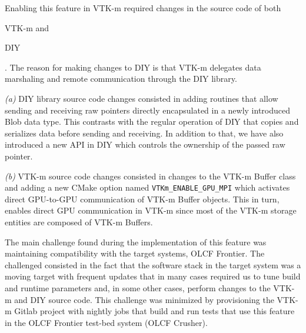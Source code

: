 Enabling this feature in VTK-m required changes in the source code of both \begin{enumerate*} [label=\itshape(\alph*\upshape)]\item VTK-m and \item DIY\end{enumerate*}. The reason for making changes to DIY is that VTK-m delegates data marshaling and remote communication through the DIY library.

\textit{(a)} DIY library source code changes consisted in adding routines that allow sending and receiving raw pointers directly encapsulated in a newly introduced Blob data type. This contrasts with the regular operation of DIY that copies and serializes data before sending and receiving. In addition to that, we have also introduced a new API in DIY which controls the ownership of the passed raw pointer.

\textit{(b)} VTK-m source code changes consisted in changes to the VTK-m Buffer class and  adding a new CMake option named \texttt{VTKm\_ENABLE\_GPU\_MPI} which activates direct GPU-to-GPU communication of VTK-m Buffer objects. This in turn, enables direct GPU communication in VTK-m since most of the VTK-m storage entities are composed of VTK-m Buffers. 

The main challenge found during the implementation of this feature was maintaining compatibility with the target systems, OLCF Frontier. The challenged consisted in the fact that the software stack in the target system was a moving target with frequent updates that in many cases required us to tune build and runtime parameters and, in some other cases, perform changes to the VTK-m and DIY source code. This challenge was minimized by provisioning the VTK-m Gitlab project with nightly jobs that build and run tests that use this feature in the OLCF Frontier test-bed system (OLCF Crusher). 
